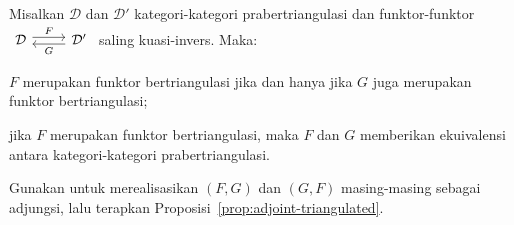 \begin{korolari}\label{prop:triangulated-equivalence}
	Misalkan $\mathcal{D}$ dan $\mathcal{D}'$ kategori-kategori
	prabertriangulasi dan funktor-funktor
	$\begin{tikzcd}
		\mathcal{D} \arrow[shift left, r, "F"] & \mathcal{D}' \arrow[shift left, l, "G"]
	\end{tikzcd}$
	saling kuasi-invers. Maka:
	\begin{compactenum}[(i)]
		\item $F$ merupakan funktor bertriangulasi jika dan hanya jika $G$ juga
		merupakan funktor bertriangulasi;
		\item jika $F$ merupakan funktor bertriangulasi, maka $F$ dan $G$
		memberikan ekuivalensi antara kategori-kategori prabertriangulasi.
	\end{compactenum}
\end{korolari}

\begin{bukti}
	Gunakan \cite[Teorema~2.6.12]{Li1} untuk merealisasikan $(F, G)$ dan
	$(G, F)$ masing-masing sebagai adjungsi, lalu terapkan
	Proposisi~\ref{prop:adjoint-triangulated}.
\end{bukti}

